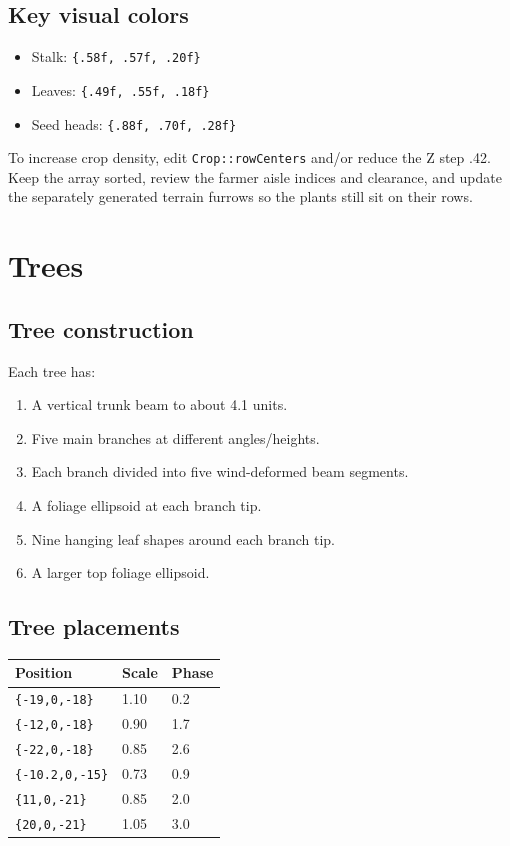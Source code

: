 \documentclass[11pt,a4paper,openany]{book}
\newcommand{\code}[1]{\texttt{#1}}
\newcommand{\rgb}[3]{\code{\{#1, #2, #3\}}}
\begin{document}
\section{Key visual colors}
\begin{itemize}
	\item Stalk: \rgb{.58f}{.57f}{.20f}
	\item Leaves: \rgb{.49f}{.55f}{.18f}
	\item Seed heads: \rgb{.88f}{.70f}{.28f}
\end{itemize}

\begin{editbox}
	To increase crop density, edit \code{Crop::rowCenters} and/or reduce the Z step .42. Keep the array sorted, review the farmer aisle indices and clearance, and update the separately generated terrain furrows so the plants still sit on their rows.
\end{editbox}

\chapter{Trees}
\section{Tree construction}
Each tree has:
\begin{enumerate}
	\item A vertical trunk beam to about 4.1 units.
	\item Five main branches at different angles/heights.
	\item Each branch divided into five wind-deformed beam segments.
	\item A foliage ellipsoid at each branch tip.
	\item Nine hanging leaf shapes around each branch tip.
	\item A larger top foliage ellipsoid.
\end{enumerate}

\section{Tree placements}
\begin{longtable}{@{}lll@{}}
	\toprule
	Position               & Scale & Phase \\
	\midrule
	\endhead
	\code{\{-19,0,-18\}}   & 1.10  & 0.2   \\
	\code{\{-12,0,-18\}}   & 0.90  & 1.7   \\
	\code{\{-22,0,-18\}}   & 0.85  & 2.6   \\
	\code{\{-10.2,0,-15\}} & 0.73  & 0.9   \\
	\code{\{11,0,-21\}}    & 0.85  & 2.0   \\
	\code{\{20,0,-21\}}    & 1.05  & 3.0   \\
	\bottomrule
\end{longtable}
\end{document}

